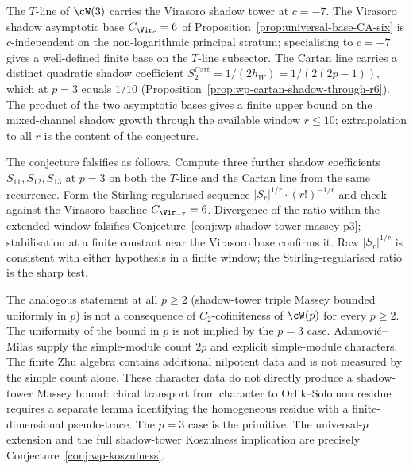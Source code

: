 \begin{remark}[Finite-window check at $p = 3$]
\label{rem:wp-massey-check-p3}
The $T$-line of $\cW(3)$ carries the Virasoro shadow tower at
$c = -7$. The Virasoro shadow asymptotic base
$C_{\Vir_c} = 6$ of
Proposition~\ref{prop:universal-base-CA-six} is
$c$-independent on the non-logarithmic principal stratum;
specialising to $c = -7$ gives a well-defined finite base on
the $T$-line subsector. The Cartan line carries a distinct
quadratic shadow coefficient
$S_2^{\mathrm{Cart}}=1/(2h_W)=1/(2(2p-1))$, which at
$p = 3$ equals $1/10$
(Proposition~\ref{prop:wp-cartan-shadow-through-r6}). The product
of the two asymptotic bases gives a finite upper bound on the
mixed-channel shadow growth through the available window
$r \leq 10$;
extrapolation to all $r$ is the content of the conjecture.
\end{remark}

\begin{remark}
\label{rem:wp-massey-falsification-p3}
The conjecture falsifies as follows. Compute three further
shadow coefficients $S_{11}, S_{12}, S_{13}$ at $p = 3$ on
both the $T$-line and the Cartan line from the same recurrence. Form
the Stirling-regularised sequence
$|S_r|^{1/r} \cdot (r!)^{-1/r}$ and check against the
Virasoro baseline $C_{\Vir_{-7}} = 6$. Divergence of the
ratio within the extended window falsifies
Conjecture~\ref{conj:wp-shadow-tower-massey-p3}; stabilisation
at a finite constant near the Virasoro base confirms it. Raw
$|S_r|^{1/r}$ is consistent with either hypothesis in a
finite window; the Stirling-regularised ratio is the sharp
test.
\end{remark}

\begin{remark}
\label{rem:wp-massey-universal-p}
The analogous statement at all $p \geq 2$
(shadow-tower triple Massey bounded uniformly in $p$) is
not a consequence of $C_2$-cofiniteness of $\cW(p)$
for every $p \geq 2$. The uniformity of the bound in $p$
is not implied by the $p = 3$ case. Adamovi\'c--Milas
\cite{AdamovicMilas2008} supply the simple-module count $2p$
and explicit simple-module characters. The finite Zhu algebra
contains additional nilpotent data and is not measured by the
simple count alone. These character data do not directly produce a
shadow-tower Massey bound: chiral transport from character to
Orlik--Solomon residue requires a separate lemma
identifying the homogeneous residue with a finite-dimensional
pseudo-trace. The $p = 3$ case is the primitive. The
universal-$p$ extension and the full shadow-tower
Koszulness implication are precisely
Conjecture~\ref{conj:wp-koszulness}.
\end{remark}
